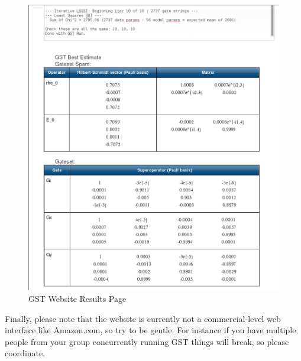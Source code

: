 \documentclass{article}[11pt]
\begin{document}
\begin{figure}
\begin{center}
\includegraphics[width=6in]{QuickStartResources/ResultsPage.jpg}
\caption{GST Website Results Page\label{figResultsPage}}
\end{center}
\end{figure}


Finally, please note that the website is currently not a commercial-level web interface like Amazon.com, so try to be gentle.  For instance if you have multiple people from your group concurrently running GST things will break, so please coordinate.
\end{document}
